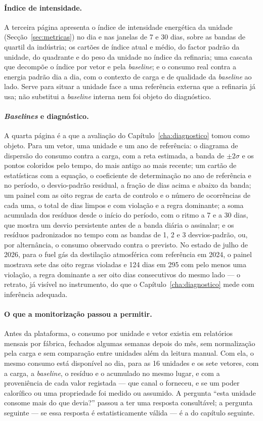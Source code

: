 \paragraph{Índice de intensidade.} A terceira página apresenta o índice
de intensidade energética da unidade (Secção~\ref{sec:metricas}) no dia e
nas janelas de 7 e 30 dias, sobre as bandas de quartil da indústria; os
cartões de índice atual e médio, do factor padrão da unidade, do quadrante
e do peso da unidade no índice da refinaria; uma cascata que decompõe o
índice por vetor e pela \emph{baseline}; e o consumo real contra a energia
padrão dia a dia, com o contexto de carga e de qualidade da
\emph{baseline} ao lado. Serve para situar a unidade face a uma referência
externa que a refinaria já usa; não substitui a \emph{baseline} interna nem
foi objeto do diagnóstico.

\paragraph{\emph{Baselines} e diagnóstico.} A quarta página é a que a
avaliação do Capítulo~\ref{cha:diagnostico} tomou como objeto. Para um
vetor, uma unidade e um ano de referência: o diagrama de dispersão do
consumo contra a carga, com a reta estimada, a banda de $\pm2\sigma$ e os
pontos coloridos pelo tempo, do mais antigo ao mais recente; um cartão de
estatísticas com a equação, o coeficiente de determinação no ano de
referência e no período, o desvio-padrão residual, a fração de dias acima
e abaixo da banda; um painel com as oito regras de carta de controlo e o
número de ocorrências de cada uma, o total de dias limpos e com violação e
a regra dominante; a soma acumulada dos resíduos desde o início do
período, com o ritmo a 7 e a 30 dias, que mostra um desvio persistente
antes de a banda diária o assinalar; e os resíduos padronizados no tempo
com as bandas de 1, 2 e 3 desvios-padrão, ou, por alternância, o consumo
observado contra o previsto. No estado de julho de 2026, para o fuel gás
da destilação atmosférica com referência em 2024, o painel mostrava sete
das oito regras violadas e 124 dias em 295 com pelo menos uma violação, a
regra dominante a ser oito dias consecutivos do mesmo lado --- o retrato,
já visível no instrumento, do que o Capítulo~\ref{cha:diagnostico} mede
com inferência adequada.

\paragraph{O que a monitorização passou a permitir.} Antes da plataforma,
o consumo por unidade e vetor existia em relatórios mensais por fábrica,
fechados algumas semanas depois do mês, sem normalização pela carga e sem
comparação entre unidades além da leitura manual. Com ela, o mesmo consumo
está disponível ao dia, para as 16 unidades e os sete vetores, com a
carga, a \emph{baseline}, o resíduo e o acumulado no mesmo lugar, e com a
proveniência de cada valor registada --- que canal o forneceu, e se um
poder calorífico ou uma propriedade foi medido ou assumido. A pergunta
``esta unidade consome mais do que devia?'' passou a ter uma resposta
consultável; a pergunta seguinte --- se essa resposta é estatisticamente
válida --- é a do capítulo seguinte.

